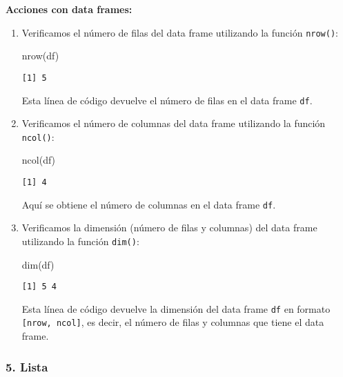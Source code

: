 \documentclass[
  a4paper,
]{article}
\newenvironment{Shaded}{}{}
\newcommand{\FunctionTok}[1]{\textcolor[rgb]{0.44,0.26,0.76}{#1}}
\newcommand{\NormalTok}[1]{\textcolor[rgb]{0.14,0.16,0.18}{#1}}
\begin{document}
\textbf{Acciones con data frames:}

\begin{enumerate}
\def\labelenumi{\arabic{enumi}.}
\item
  Verificamos el número de filas del data frame utilizando la función
  \texttt{nrow()}:

\begin{Shaded}
\begin{Highlighting}[]
\FunctionTok{nrow}\NormalTok{(df)}
\end{Highlighting}
\end{Shaded}

\begin{verbatim}
[1] 5
\end{verbatim}

  Esta línea de código devuelve el número de filas en el data frame
  \texttt{df}.
\item
  Verificamos el número de columnas del data frame utilizando la función
  \texttt{ncol()}:

\begin{Shaded}
\begin{Highlighting}[]
\FunctionTok{ncol}\NormalTok{(df)}
\end{Highlighting}
\end{Shaded}

\begin{verbatim}
[1] 4
\end{verbatim}

  Aquí se obtiene el número de columnas en el data frame \texttt{df}.
\item
  Verificamos la dimensión (número de filas y columnas) del data frame
  utilizando la función \texttt{dim()}:

\begin{Shaded}
\begin{Highlighting}[]
\FunctionTok{dim}\NormalTok{(df)}
\end{Highlighting}
\end{Shaded}

\begin{verbatim}
[1] 5 4
\end{verbatim}

  Esta línea de código devuelve la dimensión del data frame \texttt{df}
  en formato \texttt{{[}nrow,\ ncol{]}}, es decir, el número de filas y
  columnas que tiene el data frame.
\end{enumerate}

\hypertarget{lista}{%
\subsubsection{5. Lista}\label{lista}}
\end{document}
